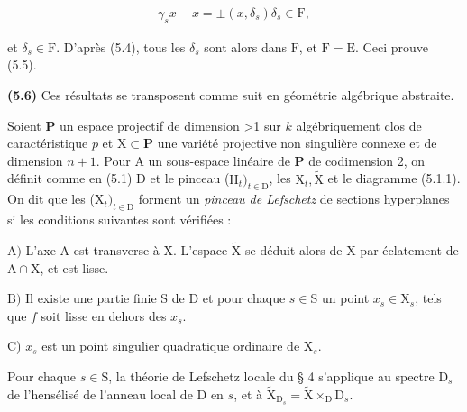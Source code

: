 \documentclass[10pt,leqno]{article}
\begin{document}
\begin{equation*}\begin{gathered}\gamma _{s} x- x = \pm (x,\delta _{s})\delta _{s} \in  \mathrm{F},\end{gathered}\end{equation*}

\noindent et \(\delta _{s}\in \mathrm{F}\). D’après (5.4), tous les \(\delta _{s}\) sont alors dans \(\mathrm{F}\), et \(\mathrm{F}=\mathrm{E}\). Ceci prouve (5.5).\par

\noindent \textbf{(5.6)} Ces résultats se transposent comme suit en géométrie algébrique abstraite.\par

\noindent Soient \(\mathbf{P}\) un espace projectif de dimension >1 sur \(k\) algébriquement clos de caractéristique \(p\) et \(\mathrm{X}\subset \mathbf{P}\) une variété projective non singulière connexe et de dimension \(n+1\). Pour \(\mathrm{A}\) un sous-espace linéaire de \(\mathbf{P}\) de codimension 2, on définit comme en (5.1) D et le pinceau (\(\mathrm{H}_{t})_{t\in \mathrm{D}}\), les \(\mathrm{X}_{t}, \widetilde{\mathrm{X}}\) et le diagramme (5.1.1). On dit que les (\(\mathrm{X}_{t})_{t\in \mathrm{D}}\) forment un \emph{pinceau de Lefschetz} de sections hyperplanes si les conditions suivantes sont vérifiées :\par

\noindent \(\mathrm{A})\) L’axe \(\mathrm{A}\) est transverse à \(\mathrm{X}\). L’espace \(\widetilde{\mathrm{X}}\) se déduit alors de \(\mathrm{X}\) par éclatement de \(\mathrm{A}\cap \mathrm{X}\), et est lisse.\par

\clearpage

\label{physical-21}

\noindent \(\mathrm{B})\) Il existe une partie finie \(\mathrm{S}\) de \(\mathrm{D}\) et pour chaque \(s\in \mathrm{S}\) un point \(x_{s}\in \mathrm{X}_{s}\), tels que \(f\) soit lisse en dehors des \(x_{s}\).\par

\noindent C) \(x_{s}\) est un point singulier quadratique ordinaire de \(\mathrm{X}_{s}\).\par

\noindent Pour chaque \(s\in \mathrm{S}\), la théorie de Lefschetz locale du § 4 s’applique au spectre \(\mathrm{D}_{s}\) de l’hensélisé de l’anneau local de \(\mathrm{D}\) en \(s\), et à \(\widetilde{\mathrm{X}}_{\mathrm{D}_{s}}=\widetilde{\mathrm{X}}\times _{\mathrm{D}} \mathrm{D}_{s}\).\par
\end{document}
